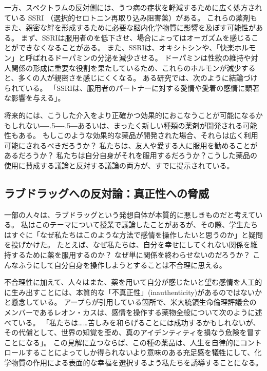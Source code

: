 \documentclass[paper=a4,book,openany]{jlreq}
\def\DDASH{―\kern-.5\zw―\kern-.5\zw―} %
\begin{document}
一方、スペクトラムの反対側には、うつ病の症状を軽減するために広く処方されている SSRI （選択的セロトニン再取り込み阻害薬）がある。
これらの薬剤もまた、親密な絆を形成するために必要な脳内化学物質に影響を及ぼす可能性がある。
まず、SSRIは服用者のを低下させ、場合によってはオーガズムを感じることができなくなることがある。
また、SSRIは、オキシトシンや、「快楽ホルモン」と呼ばれるドーパミンの分泌を減少させる。
ドーパミンは性欲の維持や対人関係の形成に重要な役割を果たしているため、これらのホルモンが減少すると、多くの人が親密さを感じにくくなる。
ある研究では、次のように結論づけられている。
「SSRIは、服用者のパートナーに対する愛情や愛着の感情に顕著な影響を与える」\citep{marazzitia14:_dimor_chang_some_featur_lovin}。

将来的には、こうした介入をより正確かつ効果的におこなうことが可能になるかもしれない{\DDASH}あるいは、まったく新しい種類の薬剤が開発される可能性もある。
もしこのような効果的な薬品が開発された場合、それらは広く利用可能にされるべきだろうか？ 私たちは、友人や愛する人に服用を勧めることがあるだろうか？ 私たちは自分自身がそれを服用するだろうか？こうした薬品の使用に賛成する議論と反対する議論の両方が、すでに提示されている。

\subsection{ラブドラッグへの反対論：真正性への脅威}

一部の人々は、ラブドラッグという発想自体が本質的に悪しきものだと考えている。
私はこのテーマについて授業で議論したことがあるが、その際、学生たちはすぐに「なぜ私たちはこのような方法で感情を操作したいと思うのか」と疑問を投げかけた。
たとえば、なぜ私たちは、自分を幸せにしてくれない関係を維持するために薬を服用するのか？ なぜ単に関係を終わらせないのだろうか？
こんなふうにして自分自身を操作しようとすることは不合理に思える。

不合理性に加えて、人々はまた、薬を用いて自分が感じたいと望む感情を人工的に生み出すことには、本質的な「不真正性」(inauthenticity)があるのではないかと懸念している。
アープらが引用している箇所で、米大統領生命倫理評議会のメンバーであるレオン・カスは、感情を操作する薬物全般について次のように述べている。
「私たちは……苦しみを和らげることには成功するかもしれないが、その代償として、世界の知覚を歪め、真のアイデンティティを損なう危険を冒すことになる」\citep[p.227]{kass03:_beyon_therap}。
この見解に立つならば、この種の薬品は、人生を自律的にコントロールすることによってしか得られないより意味のある充足感を犠牲にして、化学物質の作用による表面的な幸福を選択するよう私たちを誘導することになる。
\end{document}
